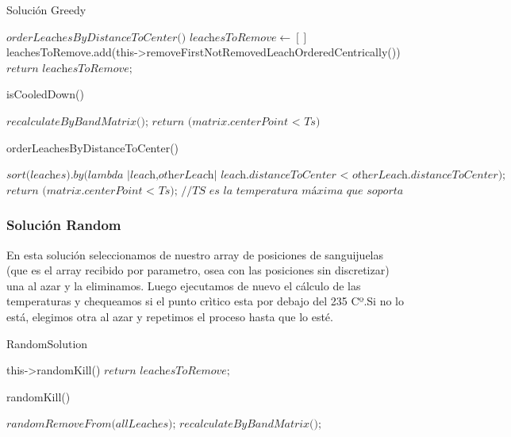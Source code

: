 \begin{algorithm}
\caption{Solución Greedy}\label{euclid}
\begin{algorithmic}[1]
\State $\textit{orderLeachesByDistanceToCenter()}$
\State $\textit{leachesToRemove} \gets []$
\Do
    \State leachesToRemove.add(this->removeFirstNotRemovedLeachOrderedCentrically())
\State $\textit{return leachesToRemove;}$
\end{algorithmic}
\end{algorithm}

\begin{algorithm}
\caption{isCooledDown()}\label{euclid}
\begin{algorithmic}[1]
\State $\textit{recalculateByBandMatrix();}$
\State $\textit{return (matrix.centerPoint < Ts)}$ 
\end{algorithmic}
\end{algorithm}

\begin{algorithm}
\caption{orderLeachesByDistanceToCenter()}\label{euclid}
\begin{algorithmic}[1]
\State $\textit{sort(leaches).by(lambda {|leach,otherLeach| leach.distanceToCenter < otherLeach.distanceToCenter});}$
\State $\textit{return (matrix.centerPoint < Ts); //TS es la temperatura máxima que soporta el centro}$
\end{algorithmic}
\end{algorithm}

\subsubsection{Solución Random}\label{sec:solucionRandom}
En esta solución seleccionamos de nuestro array de posiciones de sanguijuelas (que es el array recibido por parametro, osea con las posiciones sin discretizar) una al azar y la eliminamos. Luego ejecutamos de nuevo el cálculo de las temperaturas y chequeamos si el punto crìtico esta por debajo del 235 Cº.Si no lo está, elegimos otra al azar y repetimos el proceso hasta que lo esté. 

\begin{algorithm}
\caption{RandomSolution}\label{euclid}
\begin{algorithmic}[1]
\Do
    \State this->randomKill()
\State $\textit{return leachesToRemove;}$
\end{algorithmic}
\end{algorithm}

\begin{algorithm}
\caption{randomKill()}\label{euclid}
\begin{algorithmic}[1]
\State $\textit{randomRemoveFrom(allLeaches);}$ 
\State $\textit{recalculateByBandMatrix();}$
\end{algorithmic}
\end{algorithm}

